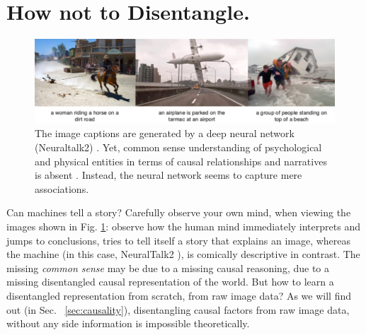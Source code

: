 \section{How not to Disentangle.}
	\begin{figure}[t]
		\centering
		\includegraphics[trim={0cm 0cm 0cm 0cm},clip, width=1.\linewidth]{fig/other/notcausal}
		\caption{The image captions are generated by a deep neural network (Neuraltalk2) \cite{karpathy15neuraltalk}. Yet, common sense understanding of psychological and physical entities in terms of causal relationships and narratives is absent \cite{tenenbaum18think}. Instead, the neural network seems to capture mere associations.}
		\label{fig:notcausal}
	\end{figure}
	Can machines tell a story? Carefully observe your own mind, when viewing the images shown in Fig. \ref{fig:notcausal}: observe how the human mind immediately interprets and jumps to conclusions, tries to tell itself a story that explains an image, whereas the machine (in this case, NeuralTalk2 \cite{karpathy15neuraltalk}), is comically descriptive in contrast.
	The missing \textit{common sense} may be due to a missing causal reasoning, due to a missing disentangled causal representation of the world.
	But how to learn a disentangled representation from scratch, \ie from raw image data?
	As we will find out (in Sec. ~\ref{sec:causality}), disentangling causal factors from raw image data, without any side information is impossible theoretically.

